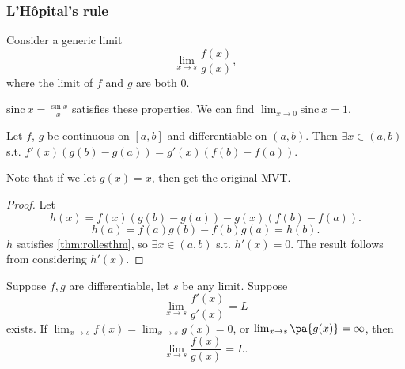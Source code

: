\documentclass[11pt]{scrartcl}
\numberwithin{equation}{section}
\begin{document}
\subsubsection{L'H\^opital's rule}
Consider a generic limit 
\[
        \lim_{x\rightarrow s}\frac{f(x)}{g(x)},
    \]
where the limit of $f$ and $g$ are both $0$.
\begin{example}
    $\mathrm{sinc}\ x = \frac{\sin x}{x}$ satisfies these 
    properties. We can find $\lim_{x\to 0}\mathrm{sinc}\ x=1$.
\end{example}
\begin{theorem}
    \label{thm:generalizedmvt}
    Let $f$, $g$ be continuous on $[a,b]$ and differentiable on $(a,b)$.
    Then $\exists x \in (a,b)$ s.t. $f'(x)(g(b)-g(a)) = g'(x)(f(b)-f(a))$.
\end{theorem}
Note that if we let $g(x)=x$, then get the original MVT.
\begin{proof}
    Let 
    \[
        h(x) = f(x)(g(b)-g(a)) - g(x)(f(b)-f(a)).
    \] 
    \[
        h(a) = f(a)g(b) - f(b)g(a) = h(b).
    \]
    $h$ satisfies \cref{thm:rollesthm}, so $\exists x\in (a,b)$ 
    s.t. $h'(x) = 0$. The result follows from considering $h'(x)$.
\end{proof}
\begin{theorem}
    \label{thm:lopital}
    Suppose $f,g$ are differentiable, let $s$ be any limit. Suppose
    \[
        \lim_{x\rightarrow s}\frac{f'(x)}{g'(x)} = L
    \]
    exists. If $\lim_{x\rightarrow s}f(x) = \lim_{x\rightarrow s}g(x) = 0$,
    or $\lim_{x\rightarrow s}\pa{g(x)} = \infty$, then 
    \[
        \lim_{x\rightarrow s}\frac{f(x)}{g(x)} = L.
    \]
\end{theorem}
\end{document}
